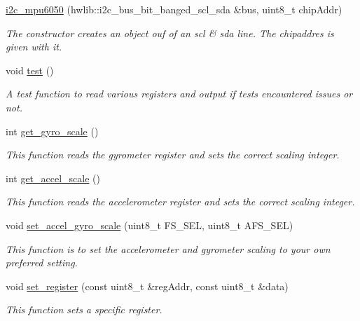 \begin{DoxyCompactItemize}
\item 
\mbox{\hyperlink{classi2c__mpu6050_a2cfbc4790fe516a2f3d84c44547afcf0}{i2c\+\_\+mpu6050}} (hwlib\+::i2c\+\_\+bus\+\_\+bit\+\_\+banged\+\_\+scl\+\_\+sda \&bus, uint8\+\_\+t chip\+Addr)
\begin{DoxyCompactList}\small\item\em The constructor creates an object ouf of an scl \& sda line. The chipaddres is given with it. \end{DoxyCompactList}\item 
void \mbox{\hyperlink{classi2c__mpu6050_a184e58b90e30780437d4dd3b0a1f2012}{test}} ()
\begin{DoxyCompactList}\small\item\em A test function to read various registers and output if tests encountered issues or not. \end{DoxyCompactList}\item 
int \mbox{\hyperlink{classi2c__mpu6050_ad8b2972b2cb7f35c0737a3cc6ba35f68}{get\+\_\+gyro\+\_\+scale}} ()
\begin{DoxyCompactList}\small\item\em This function reads the gyrometer register and sets the correct scaling integer. \end{DoxyCompactList}\item 
int \mbox{\hyperlink{classi2c__mpu6050_a2c5020be3e7dda0123748577ce3346f5}{get\+\_\+accel\+\_\+scale}} ()
\begin{DoxyCompactList}\small\item\em This function reads the accelerometer register and sets the correct scaling integer. \end{DoxyCompactList}\item 
void \mbox{\hyperlink{classi2c__mpu6050_a92b1262ea3ec807f8b5b36f16b79d812}{set\+\_\+accel\+\_\+gyro\+\_\+scale}} (uint8\+\_\+t F\+S\+\_\+\+S\+EL, uint8\+\_\+t A\+F\+S\+\_\+\+S\+EL)
\begin{DoxyCompactList}\small\item\em This function is to set the accelerometer and gyrometer scaling to your own preferred setting. \end{DoxyCompactList}\item 
void \mbox{\hyperlink{classi2c__mpu6050_a643297f7a19d0007979c80ace7c10daa}{set\+\_\+register}} (const uint8\+\_\+t \&reg\+Addr, const uint8\+\_\+t \&data)
\begin{DoxyCompactList}\small\item\em This function sets a specific register. \end{DoxyCompactList}\item 

\end{DoxyCompactItemize}
